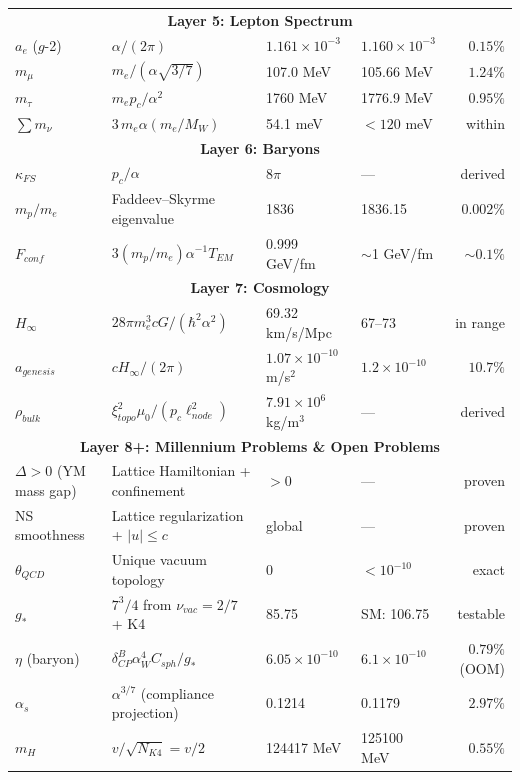 {\begin{longtable}{@{}lp{4.5cm}llr@{}}
\multicolumn{5}{c}{\cellcolor[HTML]{EFEFEF}\textbf{Layer 5: Lepton Spectrum}}\\
$a_e$ ($g$-2)  & $\alpha/(2\pi)$ & $1.161\!\times\!10^{-3}$ & $1.160\!\times\!10^{-3}$ & $0.15\%$ \\
$m_\mu$       & $m_e/(\alpha\sqrt{3/7})$ & 107.0 MeV & 105.66 MeV & $1.24\%$ \\
$m_\tau$      & $m_e p_c/\alpha^2$ & 1760 MeV & 1776.9 MeV & $0.95\%$ \\
$\sum m_\nu$  & $3\,m_e\alpha(m_e/M_W)$ & 54.1 meV & $<120$ meV & within \\

\multicolumn{5}{c}{\cellcolor[HTML]{EFEFEF}\textbf{Layer 6: Baryons}}\\
$\kappa_{FS}$ & $p_c/\alpha$ & $8\pi$ & --- & derived \\
$m_p/m_e$     & Faddeev--Skyrme eigenvalue & 1836 & 1836.15 & $0.002\%$ \\
$F_{conf}$    & $3(m_p/m_e)\alpha^{-1}T_{EM}$ & 0.999 GeV/fm & $\sim$1 GeV/fm & $\sim\!0.1\%$ \\

\multicolumn{5}{c}{\cellcolor[HTML]{EFEFEF}\textbf{Layer 7: Cosmology}}\\
$H_\infty$    & $28\pi m_e^3 cG/(\hbar^2\alpha^2)$ & 69.32 km/s/Mpc & 67--73 & in range \\
$a_{genesis}$ & $cH_\infty/(2\pi)$ & $1.07\!\times\!10^{-10}$ m/s$^2$ & $1.2\!\times\!10^{-10}$ & $10.7\%$ \\
$\rho_{bulk}$ & $\xi_{topo}^2\mu_0/(p_c\ell_{node}^2)$ & $7.91\!\times\!10^6$ kg/m$^3$ & --- & derived \\

\multicolumn{5}{c}{\cellcolor[HTML]{EFEFEF}\textbf{Layer 8+: Millennium Problems \& Open Problems}}\\
$\Delta > 0$ (YM mass gap) & Lattice Hamiltonian + confinement & $>0$ & --- & proven \\
NS smoothness & Lattice regularization + $|u|\le c$ & global & --- & proven \\
$\theta_{QCD}$ & Unique vacuum topology & $0$ & $<10^{-10}$ & exact \\
$g_*$ & $7^3/4$ from $\nu_{vac}=2/7$ + K4 & 85.75 & SM: 106.75 & testable \\
$\eta$ (baryon) & $\delta_{CP}^{B}\alpha_W^4 C_{sph}/g_*$ & $6.05\!\times\!10^{-10}$ & $6.1\!\times\!10^{-10}$ & $0.79\%$ (OOM) \\
$\alpha_s$ & $\alpha^{3/7}$ (compliance projection) & 0.1214 & 0.1179 & $2.97\%$ \\
$m_H$ & $v/\sqrt{N_{K4}} = v/2$ & 124417 MeV & 125100 MeV & $0.55\%$ \\
\end{longtable}
}


